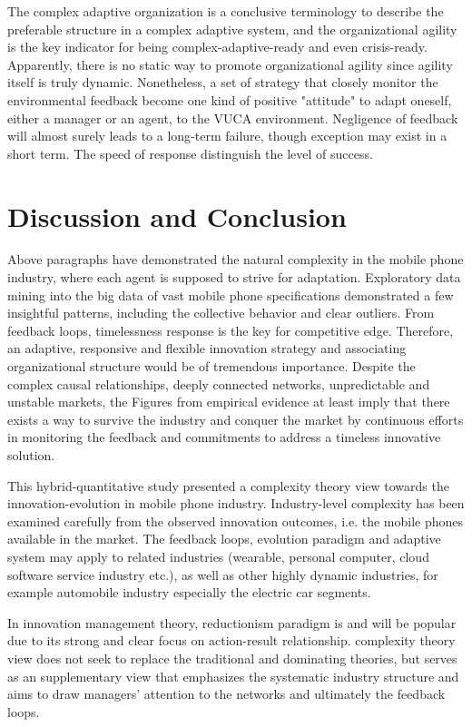 \documentclass[utf8,english]{gradu3}
\begin{document}
The complex adaptive organization is a conclusive terminology to describe the preferable structure in a complex adaptive system, and the organizational agility is the key indicator for being complex-adaptive-ready and even crisis-ready. Apparently, there is no static way to promote organizational agility since agility itself is truly dynamic. Nonetheless, a set of strategy that closely monitor the environmental feedback become one kind of positive "attitude" to adapt oneself, either a manager or an agent, to the VUCA environment. Negligence of feedback will almost surely leads to a long-term failure, though exception may exist in a short term. The speed of response distinguish the level of success.

\chapter{Discussion and Conclusion}

Above paragraphs have demonstrated the natural complexity in the mobile phone industry, where each agent is supposed to strive for adaptation. Exploratory data mining into the big data of vast mobile phone specifications demonstrated a few insightful patterns, including the collective behavior and clear outliers. From feedback loops, timelessness response is the key for competitive edge. Therefore, an adaptive, responsive and flexible innovation strategy and associating organizational structure would be of tremendous importance. Despite the complex causal relationships, deeply connected networks, unpredictable and unstable markets, the Figures from empirical evidence at least imply that there exists a way to survive the industry and conquer the market by continuous efforts in monitoring the feedback and commitments to address a timeless innovative solution. 

This hybrid-quantitative study presented a complexity theory view towards the innovation-evolution in mobile phone industry. Industry-level complexity has been examined carefully from the observed innovation outcomes, i.e. the mobile phones available in the market. The feedback loops, evolution paradigm and adaptive system may apply to related industries (wearable, personal computer, cloud software service industry etc.), as well as other highly dynamic industries, for example automobile industry especially the electric car segments. 

In innovation management theory, reductionism paradigm is and will be popular due to its strong and clear focus on action-result relationship. complexity theory view does not seek to replace the traditional and dominating theories, but serves as an supplementary view that emphasizes the systematic industry structure and aims to draw managers' attention to the networks and ultimately the feedback loops.
\end{document}
